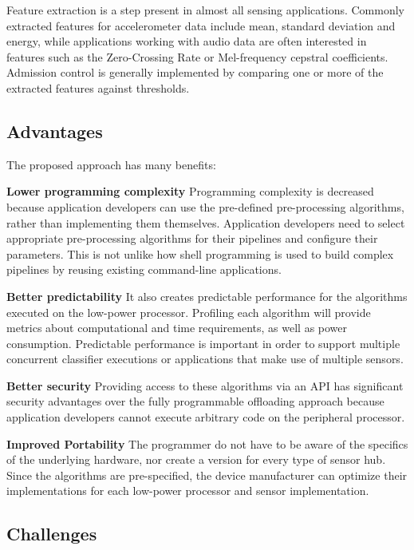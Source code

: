 Feature extraction is a
step present in almost all sensing applications.  Commonly extracted features 
for accelerometer data include mean, standard deviation and energy, while
applications working with audio data are often interested in features such as
the Zero-Crossing Rate or Mel-frequency cepstral coefficients.  Admission 
control is generally implemented by comparing one or more of the
extracted features against thresholds.


\subsection{Advantages}

The proposed approach has many benefits:


 {\bf Lower programming complexity}  Programming complexity is
  decreased because application developers can use the pre-defined
  pre-processing algorithms, rather than implementing them themselves. 
  Application developers need to select appropriate pre-processing 
  algorithms for their pipelines and configure their parameters. This 
  is not unlike how shell programming is used to build complex 
  pipelines by reusing existing command-line applications.
  

{\bf Better predictability} It also
  creates predictable performance for the algorithms executed on the
  low-power processor. Profiling each algorithm will provide metrics
  about computational and time requirements, as well as power
  consumption.  Predictable performance is important in order to
  support multiple concurrent classifier executions or applications
  that make use of multiple sensors.


{\bf Better security} Providing access to these algorithms via
  an API has significant security advantages over the fully
  programmable offloading approach because application developers
  cannot execute arbitrary code on the peripheral processor. 


{\bf Improved Portability} The programmer do not have to be
  aware of the specifics of the underlying hardware, nor  create a version
  for every type of sensor hub. Since the algorithms are
  pre-specified, the device manufacturer can optimize their
  implementations for each low-power processor and sensor
  implementation.



\subsection{Challenges}

